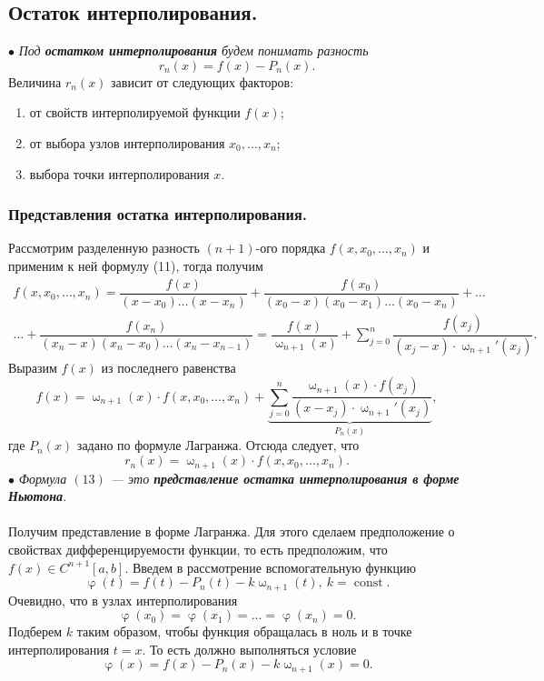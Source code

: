 \documentclass[a4paper, 12pt]{report}
\numberwithin{equation}{section}
\renewcommand{\varphi}{\upvarphi}
\renewcommand{\omega}{\upomega}
\newcommand{\const}{\operatorname{const}}
\begin{document}
	\subsection{Остаток интерполирования.}
	$\bullet$ \textit{Под \textbf{остатком интерполирования} будем понимать разность} $$r_n(x) = f(x) - P_n(x).$$
	Величина $r_n(x)$ зависит от следующих факторов:
	\begin{enumerate}
		\item от свойств интерполируемой функции $f(x)$;
		\item от выбора узлов интерполирования $x_0,\ldots,x_n$;
		\item выбора точки интерполирования $x$.
	\end{enumerate}
	\subsubsection{Представления остатка интерполирования.}
	Рассмотрим разделенную разность $(n+1)$-ого порядка $f(x,x_0,\ldots,x_n)$ и применим к ней формулу (11), тогда получим
	\begin{multline*}
		f(x,x_0,\ldots,x_n) = \dfrac{f(x)}{(x-x_0)\ldots (x-x_n)} + \dfrac{f(x_0)}{(x_0-x)(x_0-x_1)\ldots(x_0-x_n)} + \ldots \\ \ldots + \dfrac{f(x_n)}{(x_n-x)(x_n-x_0)\ldots (x_n-x_{n-1})} = \dfrac{f(x)}{\omega_{n+1}(x)} + \sum_{j=0}^{n}\dfrac{f(x_j)}{(x_j-x)\cdot \omega_{n+1}'(x_j)}.
	\end{multline*}
	Выразим $f(x)$ из последнего равенства $$f(x) = \omega_{n+1}(x)\cdot f(x,x_0,\ldots, x_n) + \underbrace{\sum_{j=0}^{n}\dfrac{\omega_{n+1}(x)\cdot f(x_j)}{(x-x_j)\cdot \omega_{n+1}'(x_j)}}_{P_n(x)},$$
	где $P_n(x)$ задано по формуле Лагранжа. Отсюда следует, что 
	\begin{equation}
		r_n(x) = \omega_{n+1}(x)\cdot f(x,x_0,\ldots, x_n).
	\end{equation}
	$\bullet$ \textit{Формула $(13)$ --- это \textbf{представление остатка интерполирования в форме Ньютона}.}\\\\
	Получим представление в форме Лагранжа. Для этого сделаем предположение о свойствах дифференцируемости функции, то есть предположим, что $f(x)\in C^{n+1}[a,b]$. Введем в рассмотрение вспомогательную функцию $$\varphi(t) = f(t) - P_n(t) - k\omega_{n+1}(t),\ k = \const.$$
	Очевидно, что в узлах интерполирования $$\varphi(x_0) = \varphi(x_1)=\ldots = \varphi(x_n) = 0.$$
	Подберем $k$ таким образом, чтобы функция обращалась в ноль и в точке интерполирования $t=x$. То есть должно выполняться условие $$\varphi(x) = f(x) - P_n(x) - k\omega_{n+1}(x) = 0.$$
\end{document}
